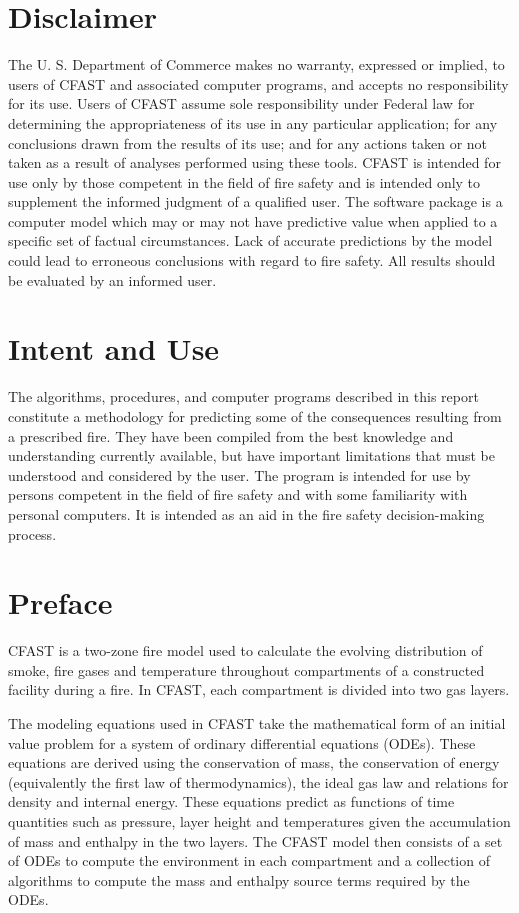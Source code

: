 \documentclass[12pt]{book}
\begin{document}
\pagestyle{plain}

\chapter{Disclaimer}

The U. S. Department of Commerce makes no warranty, expressed or implied, to users of
CFAST and associated computer programs, and accepts no responsibility for its use.  Users of
CFAST assume sole responsibility under Federal law for determining the appropriateness of its
use in any particular application; for any conclusions drawn from the results of its use; and for
any actions taken or not taken as a result of analyses performed using these tools.
CFAST is intended for use only by those competent in the field of fire safety and is intended
only to supplement the informed judgment of a qualified user. The software package is a
computer model which may or may not have predictive value when applied to a specific set of
factual circumstances. Lack of accurate predictions by the model could lead to erroneous
conclusions with regard to fire safety. All results should be evaluated by an informed user.

\chapter{Intent and Use}

The algorithms, procedures, and computer programs described in this report constitute a
methodology for predicting some of the consequences resulting from a prescribed fire.  They
have been compiled from the best knowledge and understanding currently available, but have
important limitations that must be understood and considered by the user.  The program is
intended for use by persons competent in the field of fire safety and with some familiarity with
personal computers. It is intended as an aid in the fire safety decision-making process.

\chapter{Preface}

CFAST is a two-zone fire model used to calculate the evolving distribution of smoke, fire gases
and temperature throughout compartments of a constructed facility during a fire. In CFAST,
each compartment is divided into two gas layers.

The modeling equations used in CFAST take the mathematical form of an initial value problem
for a system of ordinary differential equations (ODEs). These equations are derived using the
conservation of mass, the conservation of energy (equivalently the first law of thermodynamics),
the ideal gas law and relations for density and internal energy. These equations predict as
functions of time quantities such as pressure, layer height and temperatures given the
accumulation of mass and enthalpy in the two layers. The CFAST model then consists of a set
of ODEs to compute the environment in each compartment and a collection of algorithms to
compute the mass and enthalpy source terms required by the ODEs.
\end{document}
